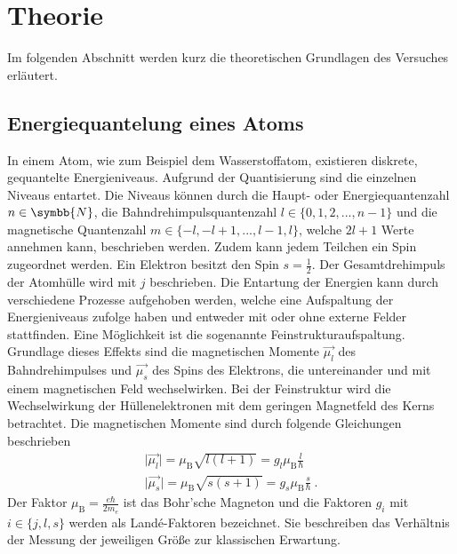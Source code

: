 \section{Theorie}
\label{sec:theorie}

    Im folgenden Abschnitt werden kurz die theoretischen Grundlagen des Versuches erläutert.

\subsection{Energiequantelung eines Atoms}

    In einem Atom,
    wie zum Beispiel dem Wasserstoffatom,
    existieren diskrete, gequantelte Energieniveaus.
    Aufgrund der Quantisierung sind die einzelnen Niveaus entartet.
    Die Niveaus können durch die Haupt- oder Energiequantenzahl $n \in \symbb{N}$,
    die Bahndrehimpulsquantenzahl $l \in \{0, 1, 2, ... , n-1\}$ und die magnetische Quantenzahl $m \in \{-l, -l+1, ..., l-1, l\}$,
    welche $2l + 1$ Werte annehmen kann,
    beschrieben werden.
    Zudem kann jedem Teilchen ein Spin zugeordnet werden.
    Ein Elektron besitzt den Spin $s = \frac{1}{2}$.
    Der Gesamtdrehimpuls der Atomhülle wird mit $j$ beschrieben.
    Die Entartung der Energien kann durch verschiedene Prozesse aufgehoben werden,
    welche eine Aufspaltung der Energieniveaus zufolge haben und entweder mit oder ohne externe Felder stattfinden.
    Eine Möglichkeit ist die sogenannte Feinstrukturaufspaltung.
    Grundlage dieses Effekts sind die magnetischen Momente $\vec{\mu_l}$ des Bahndrehimpulses und $\vec{\mu_s}$ des Spins des Elektrons,
    die untereinander und mit einem magnetischen Feld wechselwirken.
    Bei der Feinstruktur wird die Wechselwirkung der Hüllenelektronen mit dem geringen Magnetfeld des Kerns betrachtet.
    Die magnetischen Momente sind durch folgende Gleichungen beschrieben
    \begin{gather}
        \lvert \vec{\mu_l} \rvert = \mu_\text{B} \sqrt{l(l+1)} = g_l \mu_\text{B} \frac{l}{\hbar}
        \label{eqn:magn_mom_l} \\
        \lvert \vec{\mu_s} \rvert = \mu_\text{B} \sqrt{s(s+1)} = g_s \mu_\text{B} \frac{s}{\hbar} \ .
        \label{eqn:magn_mom_s}
    \end{gather}
    Der Faktor $\mu_\text{B} = \frac{e \hbar}{2 m_{e}}$ ist das Bohr'sche Magneton und die Faktoren $g_{i}$ mit $i \in \{j,l,s\}$ werden als Landé-Faktoren bezeichnet.
    Sie beschreiben das Verhältnis der Messung der jeweiligen Größe zur klassischen Erwartung.
